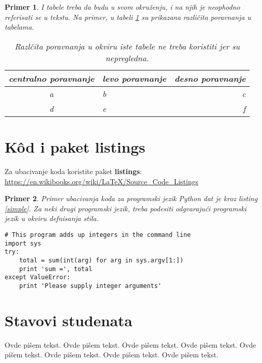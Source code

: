\documentclass[a4paper]{article}
\newtheorem{primer}{Primer}[section]
\begin{document}
\begin{primer} I tabele treba da budu u svom okruženju, i na njih je neophodno referisati se u tekstu. Na primer, u tabeli \ref{tab:tabela1} su prikazana različita poravnanja u tabelama.

\begin{table}[h!]
\begin{center}
\caption{Razlčita poravnanja u okviru iste tabele ne treba koristiti jer su nepregledna.}
\begin{tabular}{|c|l|r|} \hline
centralno poravnanje& levo poravnanje& desno poravnanje\\ \hline
a &b&c\\ \hline
d &e&f\\ \hline
\end{tabular}
\label{tab:tabela1}
\end{center}
\end{table}

\end{primer}

\section{K\^{o}d i paket listings}
Za ubacivanje koda koristite paket \textbf{listings}:
\url{https://en.wikibooks.org/wiki/LaTeX/Source_Code_Listings}

\begin{primer}
Primer ubacivanja koda za programski jezik Python dat je kroz listing \ref{simple}. Za neki drugi programski jezik, treba podesiti odgvarajući programski jezik u okviru defnisanja stila.
\end{primer}
\begin{lstlisting}[caption={Primer ubacivanja koda u tekst},frame=single, label=simple]
# This program adds up integers in the command line
import sys
try:
    total = sum(int(arg) for arg in sys.argv[1:])
    print 'sum =', total
except ValueError:
    print 'Please supply integer arguments'
\end{lstlisting}


\section{Stavovi studenata}
\label{sec:stavovi_studenata}


Ovde pišem tekst. 
Ovde pišem tekst. 
Ovde pišem tekst. 
Ovde pišem tekst. 
Ovde pišem tekst. 
Ovde pišem tekst. 
Ovde pišem tekst. 
Ovde pišem tekst. 
\end{document}
